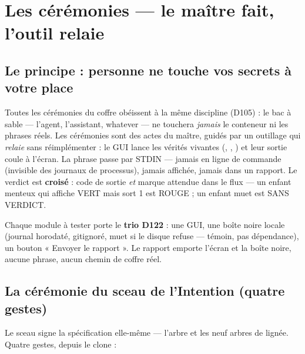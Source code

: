 \section{Les cérémonies — le maître fait, l'outil relaie}\label{sec:ceremonies}

\subsection{Le principe : personne ne touche vos secrets à votre place}

Toutes les cérémonies du coffre obéissent à la même discipline (D105) : le bac à
sable — l'agent, l'assistant, whatever — ne touchera \emph{jamais} le conteneur ni
les phrases réels. Les cérémonies sont des actes du maître, guidés par un outillage
qui \emph{relaie} sans réimplémenter : le GUI lance les vérités vivantes
(, , ) et leur sortie
coule à l'écran. La phrase passe par STDIN — jamais en ligne de commande (invisible
des journaux de processus), jamais affichée, jamais dans un rapport. Le verdict est
\textbf{croisé} : code de sortie \emph{et} marque attendue dans le flux — un enfant
menteux qui affiche VERT mais sort 1 est ROUGE ; un enfant muet est SANS VERDICT.

Chaque module à tester porte le \textbf{trio D122} : une GUI, une boîte noire locale
(journal horodaté, gitignoré, muet si le disque refuse — témoin, pas dépendance), un
bouton « Envoyer le rapport ». Le rapport emporte l'écran et la boîte noire, aucune
phrase, aucun chemin de coffre réel.

\subsection{La cérémonie du sceau de l'Intention (quatre gestes)}\label{sec:cersceau}

Le sceau signe la spécification elle-même — l'arbre  et les neuf arbres
de lignée. Quatre gestes, depuis le clone :

